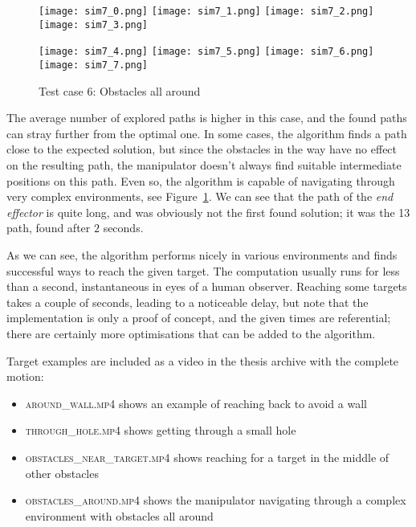 \begin{figure}[h]
  \centering
  \begin{minipage}{\textwidth}
    \texttt{[image: sim7\_0.png]}
    \texttt{[image: sim7\_1.png]}
    \texttt{[image: sim7\_2.png]}
    \texttt{[image: sim7\_3.png]}

    \texttt{[image: sim7\_4.png]}
    \texttt{[image: sim7\_5.png]}
    \texttt{[image: sim7\_6.png]}
    \texttt{[image: sim7\_7.png]}
  \end{minipage}
  \caption{Test case 6: Obstacles all around}\label{fig:sim7}
\end{figure}

The average number of explored paths is higher in this case, and the found paths can stray further from the optimal one. In some cases, the algorithm finds a path close to the expected solution, but since the obstacles in the way have no effect on the resulting path, the manipulator doesn't always find suitable intermediate positions on this path. Even so, the algorithm is capable of navigating through very complex environments, see Figure~\ref{fig:sim7}. We can see that the path of the \textit{end effector} is quite long, and was obviously not the first found solution; it was the 13\th{} path, found after $2$ seconds.

As we can see, the algorithm performs nicely in various environments and finds successful ways to reach the given target. The computation usually runs for less than a second, instantaneous in eyes of a human observer. Reaching some targets takes a couple of seconds, leading to a noticeable delay, but note that the implementation is only a proof of concept, and the given times are referential; there are certainly more optimisations that can be added to the algorithm.

Target examples are included as a video in the thesis archive with the complete motion:

\begin{itemize}
\item \textsc{around\_wall.mp4} shows an example of reaching back to avoid a wall
\item \textsc{through\_hole.mp4} shows getting through a small hole
\item \textsc{obstacles\_near\_target.mp4} shows reaching for a target in the middle of other obstacles
\item \textsc{obstacles\_around.mp4} shows the manipulator navigating through a complex environment with obstacles all around
\end{itemize}

